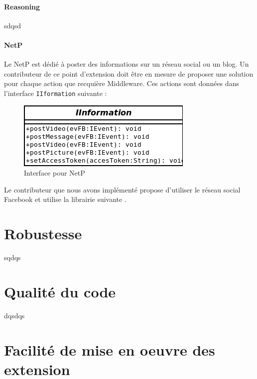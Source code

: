 \paragraph{Reasoning}
sdqsd
\paragraph{NetP}
Le  NetP est dédié à poster des informations sur un  réseau social ou un blog. Un contributeur de ce point d'extension doit être en mesure de proposer une solution pour chaque action que recquière Middleware. Ces actions sont données dans l'interface \verb+IIformation+ suivante :
\begin{figure}[!htbp]
  \centering
  \includegraphics[scale=0.50]{img/iinterface}
  \caption{Interface pour NetP}
  \label{fig:IInterface}
\end{figure}

Le contributeur que nous avons implémenté propose d'utiliser le réseau social Facebook et utilise la librairie suivante \cite{restFB}.


\section{Robustesse}
sqdqs
\section{Qualité du code}
dqsdqs
\section{Facilité de mise en oeuvre des extension}
